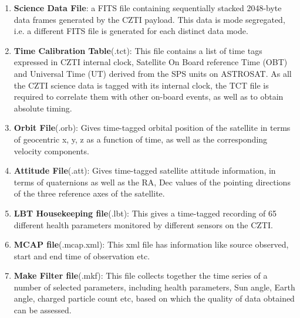 \documentclass[11pt,oneside,a4paper]{article}
\begin{document}
\begin{enumerate}

\item {{\bf Science     Data    File}:   a   FITS    file    containing  sequentially    stacked     2048-byte   data   
frames  generated   by  the CZTI    payload.        This    data    is  mode    segregated, i.e.    a   different   
FITS    file    is  generated   for each    distinct    data    mode.}

\item{{\bf Time    Calibration     Table}(.tct):    This     file   contains    a   list    of   time    tags   expressed   in  
CZTI     internal    clock,  Satellite   On  Board   reference   Time    (OBT)   and     Universal   Time  
(UT)    derived from    the SPS units   on  ASTROSAT.       As  all the CZTI    science data    is  tagged  
with    its internal    clock,  the TCT file    is  required    to  correlate   them    with    other   on-board    
events, as  well   as  to  obtain  absolute    timing.}

\item{{\bf Orbit   File}(.orb):   Gives   time-tagged     orbital     position    of  the     satellite   in  terms   of 
geocentric  x,  y,  z   as  a  function  of  time, as well as the corresponding velocity components.}

\item{{\bf Attitude    File}(.att):   Gives   time-tagged     satellite   attitude    information,    in  terms   of 
quaternions  as  well    as  the     RA,     Dec     values  of  the     pointing    directions  of  the     three  
reference   axes    of  the satellite.}

\item{{\bf LBT     Housekeeping    file}(.lbt):   This    gives   a   time-tagged     recording   of  65  different
health parameters   monitored   by  different   sensors on  the CZTI.}

\item{{\bf MCAP file}(.mcap.xml): This xml file has information like source observed, start and end time of observation etc.}

\item{ {\bf Make  Filter  file}(.mkf):  This    file    collects    together    the time    series  of  a   number  of  
selected     parameters,     including   health  parameters,     Sun     angle,  Earth   angle,  charged    
particle    count   etc,    based   on  which   the quality of  data    obtained    can be  assessed.}


\end{enumerate}
\end{document}
